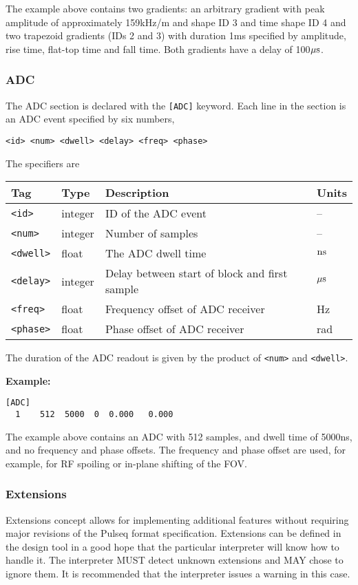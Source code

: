 \documentclass{article}
\begin{document}
The example above contains two gradients: an arbitrary gradient with peak amplitude of approximately 159kHz/m and shape ID 3 and time shape ID 4 and two trapezoid gradients (IDs 2 and 3) with duration 1ms specified by amplitude, rise time, flat-top time and fall time.
Both gradients have a delay of 100$\rm \mu s$.

\subsubsection{ADC}
The ADC section is declared with the \verb.[ADC]. keyword. Each line in the section is an ADC event specified by six numbers,
\begin{lstlisting}
<id> <num> <dwell> <delay> <freq> <phase>
\end{lstlisting}

The specifiers are

\begin{tabularx}{\textwidth}{llXl}
\toprule
Tag & Type & Description & Units\\
\midrule
\verb.<id>. & integer & ID of the ADC event & -- \\
\verb.<num>. & integer & Number of samples & -- \\
\verb.<dwell>. & float & The ADC dwell time & $\rm n s$ \\
\verb.<delay>. & integer & Delay between start of block and first sample & $\rm \mu s$  \\
\verb.<freq>. & float & Frequency offset of ADC receiver & Hz \\
\verb.<phase>. & float & Phase offset of ADC receiver & rad \\
\bottomrule
\end{tabularx}

The duration of the ADC readout is given by the product of \verb.<num>. and \verb.<dwell>..

\begin{minipage}{\textwidth}
\textbf{Example:}
\begin{lstlisting}
[ADC]
  1    512  5000  0  0.000   0.000
\end{lstlisting}
\end{minipage}

The example above contains an ADC with 512 samples, and dwell time of 5000ns, and no frequency and phase offsets. The frequency and phase offset are used, for example, for RF spoiling or in-plane shifting of the FOV.

\subsubsection{Extensions}
Extensions concept allows for implementing additional features without requiring major revisions of the Pulseq format specification. Extensions can be defined in the design tool in a good hope that the particular interpreter will know how to handle it. The interpreter MUST detect unknown extensions and MAY chose to ignore them. It is recommended that the interpreter issues a warning in this case. 
\end{document}
